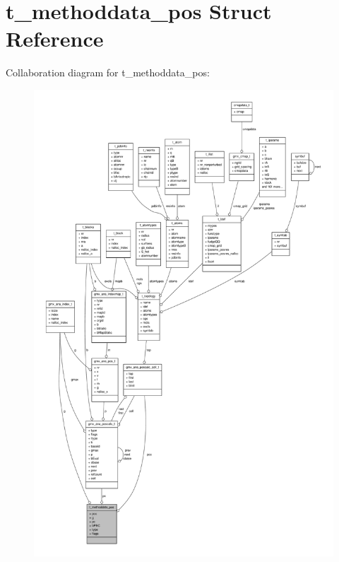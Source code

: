\hypertarget{structt__methoddata__pos}{\section{t\-\_\-methoddata\-\_\-pos \-Struct \-Reference}
\label{structt__methoddata__pos}
}


\-Collaboration diagram for t\-\_\-methoddata\-\_\-pos\-:
\nopagebreak
\begin{figure}[H]
\begin{center}
\leavevmode
\includegraphics[width=350pt]{structt__methoddata__pos__coll__graph}
\end{center}
\end{figure}
